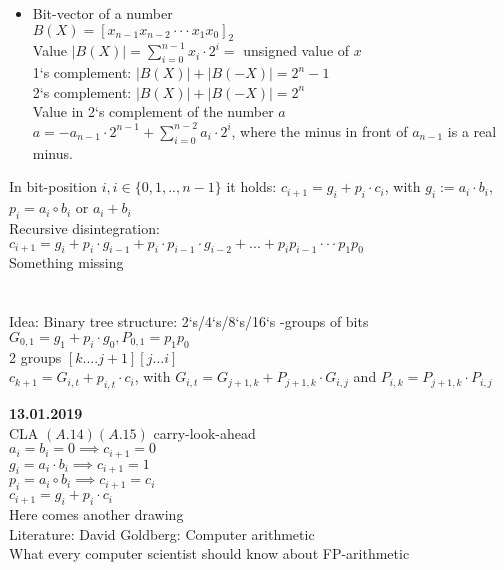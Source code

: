 \documentclass[a4paper, 11pt]{report}
\theoremstyle{break}
\theoremstyle{proofstyle}
\begin{document}
\begin{itemize}
\begin{enumerate}
\begin{itemize}
                \item Bit-vector of a number \\
                $B(X)=[x_{n-1}x_{n-2}\cdot \cdot \cdot x_1x_0]_2$ \\
                Value $|B(X)|=\sum_{i=0}^{n-1} x_i\cdot 2^i=$ unsigned value of $x$\\
                1`s complement: $|B(X)|+|B(-X)|=2^n-1$ \\
                2`s complement: $|B(X)|+|B(-X)|=2^n$ \\
                Value in 2`s complement of the number $a$ \\
                $a=-a_{n-1}\cdot 2^{n-1}+\sum_{i=0}^{n-2}a_i\cdot 2^i$, where the minus in front of $a_{n-1}$ is a real minus. \\
            \end{itemize}
            In bit-position $i, i\in\{0,1,..,n-1\}$ it holds: $c_{i+1}=g_i+p_i\cdot c_i$, with $g_i:=a_i\cdot b_i$, $p_i=a_i\circ b_i$ or $a_i+b_i$ \\
            Recursive disintegration: \\
            $c_{i+1}=g_i+p_i\cdot g_{i-1}+p_i\cdot p_{i-1}\cdot g_{i-2}+ ...+p_ip_{i-1} \cdot \cdot \cdot p_1p_0$ \\ 
            Something missing \\
            \\
            \\
            Idea: Binary tree structure: 2`s/4`s/8`s/16`s -groups of bits $G_{0,1}=g_1+p_i\cdot g_0, P_{0,1}=p_1p_0$ \\
            2 groups $[k .... j+1][j ... i]$ \\
            $c_{k+1}=G_{i,t}+p_{i,t}\cdot c_i$, with $G_{i,t}=G_{j+1,k}+P_{j+1,k}\cdot G_{i,j}$ and $P_{i,k}=P_{j+1,k}\cdot P_{i,j}$ \\

        \end{enumerate}
    \end{itemize} \bigskip
    
    \textbf{13.01.2019} \\
    \to CLA $(A.14)(A.15)$ carry-look-ahead \\
    $a_i=b_i=0 \implies c_{i+1}=0$ \\
    $g_i=a_i\cdot b_i \implies c_{i+1}=1$ \\
    $p_i=a_i\circ b_i \implies c_{i+1}=c_i$ \\ 
    $c_{i+1}=g_i+p_i\cdot c_i$ \\
    Here comes another drawing \\
    Literature: David Goldberg: Computer arithmetic\\
    What every computer scientist should know about FP-arithmetic \\
    
\end{document}
